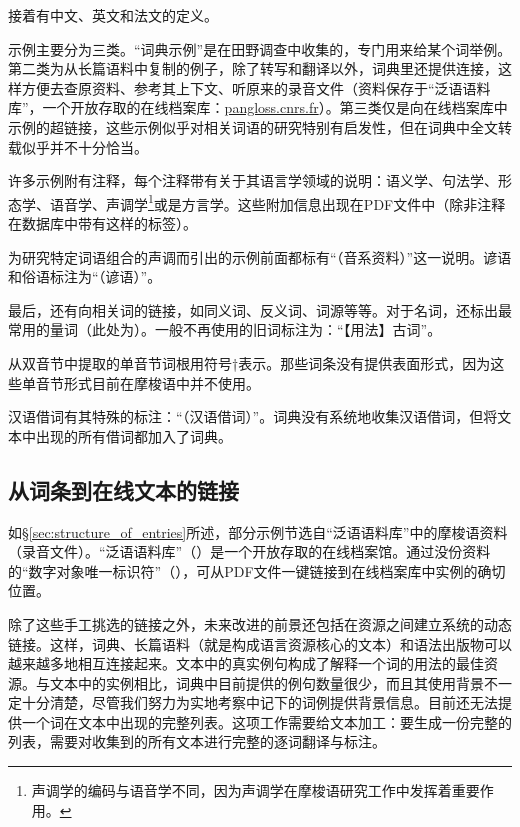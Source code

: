 接着有中文、英文和法文的定义。

示例主要分为三类。“词典示例”是在田野调查中收集的，专门用来给某个词举例。第二类为从长篇语料中复制的例子，除了转写和翻译以外，词典里还提供连接，这样方便去查原资料、参考其上下文、听原来的录音文件（资料保存于“泛语语料库”，一个开放存取的在线档案库：\href{https://pangloss.cnrs.fr/}{pangloss.cnrs.fr}）。第三类仅是向在线档案库中示例的超链接，这些示例似乎对相关词语的研究特别有启发性，但在词典中全文转载似乎并不十分恰当。

许多示例附有注释，每个注释带有关于其语言学领域的说明：语义学、句法学、形态学、语音学、声调学\footnote{声调学的编码与语音学不同，因为声调学在摩梭语研究工作中发挥着重要作用。}或是方言学。这些附加信息出现在PDF文件中（除非注释在数据库中带有这样的标签）。

为研究特定词语组合的声调而引出的示例前面都标有“（音系资料）”这一说明。谚语和俗语标注为“（谚语）”。

最后，还有向相关词的链接，如同义词、反义词、词源等等。对于名词，还标出最常用的量词（此处为）。一般不再使用的旧词标注为：“【用法】古词”。

从双音节中提取的单音节词根用符号†表示。那些词条没有提供表面形式，因为这些单音节形式目前在摩梭语中并不使用。

汉语借词有其特殊的标注：“（汉语借词）”。词典没有系统地收集汉语借词，但将文本中出现的所有借词都加入了词典。

\subsection{从词条到在线文本的链接}

如§\ref{sec:structure_of_entries}所述，部分示例节选自“泛语语料库”中的摩梭语资料（录音文件）。“泛语语料库”（）是一个开放存取的在线档案馆\parencite[参见][]{michailovskyetal2014}。通过没份资料的“数字对象唯一标识符”（），可从PDF文件一键链接到在线档案库中实例的确切位置。

除了这些手工挑选的链接之外，未来改进的前景还包括在资源之间建立系统的动态链接。这样，词典、长篇语料（就是构成语言资源核心的文本）和语法出版物可以越来越多地相互连接起来\parencite{maxwell2012}。文本中的真实例句构成了解释一个词的用法的最佳资源。与文本中的实例相比，词典中目前提供的例句数量很少，而且其使用背景不一定十分清楚，尽管我们努力为实地考察中记下的词例提供背景信息。目前还无法提供一个词在文本中出现的完整列表。这项工作需要给文本加工：要生成一份完整的列表，需要对收集到的所有文本进行完整的逐词翻译与标注。



